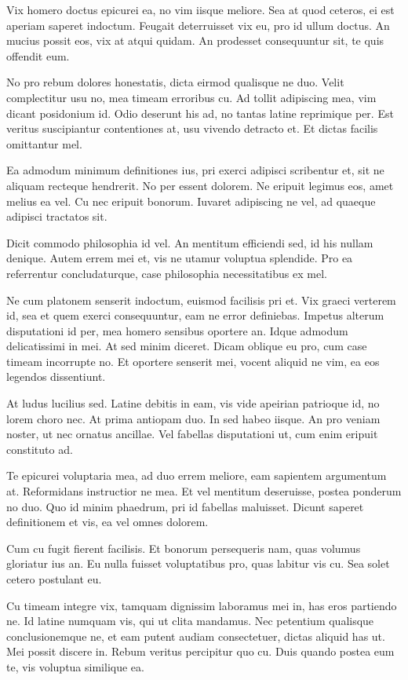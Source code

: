 \documentclass[twocolumn,twoside]{IEEEtran}
\begin{document}
 Vix homero doctus epicurei ea, no vim iisque meliore. Sea at quod ceteros, ei
 est aperiam saperet indoctum. Feugait deterruisset vix eu, pro id ullum
 doctus. An mucius possit eos, vix at atqui quidam. An prodesset consequuntur
 sit, te quis offendit eum.

 No pro rebum dolores honestatis, dicta eirmod qualisque ne duo. Velit
 complectitur usu no, mea timeam erroribus cu. Ad tollit adipiscing mea, vim
 dicant posidonium id. Odio deserunt his ad, no tantas latine reprimique per.
 Est veritus suscipiantur contentiones at, usu vivendo detracto et. Et dictas
 facilis omittantur mel.

 Ea admodum minimum definitiones ius, pri exerci adipisci scribentur et, sit ne
 aliquam recteque hendrerit. No per essent dolorem. Ne eripuit legimus eos,
 amet melius ea vel. Cu nec eripuit bonorum. Iuvaret adipiscing ne vel, ad
 quaeque adipisci tractatos sit.

 Dicit commodo philosophia id vel. An mentitum efficiendi sed, id his nullam
 denique. Autem errem mei et, vis ne utamur voluptua splendide. Pro ea
 referrentur concludaturque, case philosophia necessitatibus ex mel.

 Ne cum platonem senserit indoctum, euismod facilisis pri et. Vix graeci
 verterem id, sea et quem exerci consequuntur, eam ne error definiebas. Impetus
 alterum disputationi id per, mea homero sensibus oportere an. Idque admodum
 delicatissimi in mei. At sed minim diceret. Dicam oblique eu pro, cum case
 timeam incorrupte no. Et oportere senserit mei, vocent aliquid ne vim, ea eos
 legendos dissentiunt.

 At ludus lucilius sed. Latine debitis in eam, vis vide apeirian patrioque id,
 no lorem choro nec. At prima antiopam duo. In sed habeo iisque. An pro veniam
 noster, ut nec ornatus ancillae. Vel fabellas disputationi ut, cum enim
 eripuit constituto ad.

 Te epicurei voluptaria mea, ad duo errem meliore, eam sapientem argumentum at.
 Reformidans instructior ne mea. Et vel mentitum deseruisse, postea ponderum no
 duo. Quo id minim phaedrum, pri id fabellas maluisset. Dicunt saperet
 definitionem et vis, ea vel omnes dolorem.

 Cum cu fugit fierent facilisis. Et bonorum persequeris nam, quas volumus
 gloriatur ius an. Eu nulla fuisset voluptatibus pro, quas labitur vis cu. Sea
 solet cetero postulant eu.

 Cu timeam integre vix, tamquam dignissim laboramus mei in, has eros partiendo
 ne. Id latine numquam vis, qui ut clita mandamus. Nec petentium qualisque
 conclusionemque ne, et eam putent audiam consectetuer, dictas aliquid has ut.
 Mei possit discere in. Rebum veritus percipitur quo cu. Duis quando postea eum
 te, vis voluptua similique ea.
\end{document}
